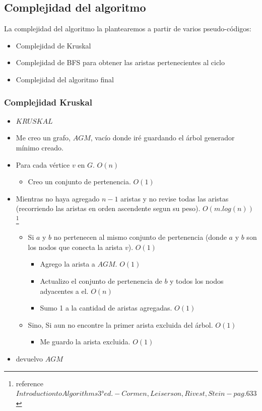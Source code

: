 \subsection{Complejidad del algoritmo}

La complejidad del algoritmo la plantearemos a partir de varios pseudo-códigos:

\begin{itemize}
\item Complejidad de Kruskal
\item Complejidad de BFS para obtener las aristas pertenecientes al ciclo
\item Complejidad del algoritmo final
\end{itemize}

\subsubsection{Complejidad Kruskal}


\begin{itemize}
\item $KRUSKAL$
\item Me creo un grafo, $AGM$, vacío donde iré guardando el árbol generador mínimo creado.
\item Para cada vértice $v$ en $G$. $O(n)$
\begin{itemize}
	\item Creo un conjunto de pertenencia. $O(1)$
\end{itemize}
\item Mientras no haya agregado $n-1$ aristas y no revise todas las aristas (recorriendo las aristas en orden ascendente segun su peso). $O(m.log(n))$ \footnote{reference $Introduction to Algorithms 3° ed. - Cormen, Leiserson, Rivest, Stein - pag. 633$}
\begin{itemize}
	\item Si $a$ y $b$ no pertenecen al mismo conjunto de pertenencia (donde $a$ y $b$ son los nodos que conecta la arista $v$). $O(1)$
	\begin{itemize}
		\item Agrego la arista a $AGM$. $O(1)$
		\item Actualizo el conjunto de pertenencia de $b$ y todos los nodos adyacentes a el. $O(n)$ 
		\item Sumo 1 a la cantidad de aristas agregadas. $O(1)$
	\end{itemize}
	\item Sino, Si aun no encontre la primer arista excluida del árbol. $O(1)$
	\begin{itemize}
		\item Me guardo la arista excluida. $O(1)$
	\end{itemize}
\end{itemize}
\item devuelvo $AGM$
\end{itemize}


